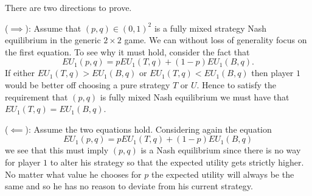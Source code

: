 \documentclass[a4paper]{article}
\begin{document}
\begin{exercise}{4}
  There are two directions to prove.

  ($ \implies $): Assume that $ (p,q ) \in (0, 1)^2 $ is a fully mixed strategy Nash equilibrium in the generic $ 2 \times 2 $ game. We can without loss of generality focus on the first equation. To see why it must hold, consider the fact that
  \begin{equation*}
  EU_1(p,q) = p EU_1(T, q) + (1 - p) EU_1(B, q)
  .\end{equation*}
  If either $ EU_1(T, q) > EU_1(B, q) $ or $ EU_1(T, q) < EU_1(B, q) $ then player $ 1 $ would be better off choosing a pure strategy $ T $ or $ U $. Hence to satisfy the requirement that $ (p, q) $ is fully mixed Nash equilibrium we must have that $ EU_1(T, q) = EU_1(B, q) $.

  ($ \impliedby $): Assume the two equations hold. Considering again the equation
  \begin{equation*}
  EU_1(p,q) = p EU_1(T, q) + (1 - p) EU_1(B, q)
  \end{equation*}
  we see that this must imply $ (p, q) $ is a Nash equilibrium since there is no way for player $ 1 $ to alter his strategy so that the expected utility gets strictly higher. No matter what value he chooses for $ p $ the expected utility will always be the same and so he has no reason to deviate from his current strategy.
\end{exercise}
\end{document}
